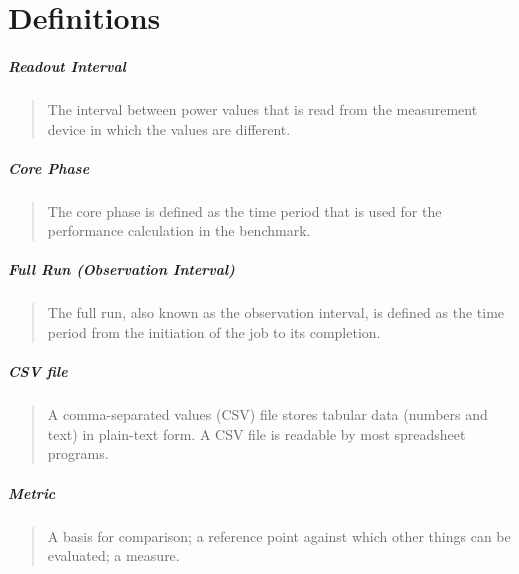 \chapter{Definitions}
\label{sec:definitions}

\setlength{\parskip}{1pt}
\paragraph*{Readout Interval}
\begin{quote}
The interval between power values that is read from the measurement device in which the values are different.
\end{quote}

\setlength{\parskip}{1pt}
\paragraph*{Core Phase}
\begin{quote}
The core phase is defined as the time period that is used for the performance calculation in the benchmark.
\end{quote}

\setlength{\parskip}{1pt}
\paragraph*{Full Run (Observation Interval)}
\begin{quote}
The full run, also known as the observation interval, is defined as the time period from the initiation of the job to its completion.
\end{quote}


\paragraph*{CSV file}
\begin{quote}
A comma-separated values (CSV) file stores tabular data (numbers and text) in plain-text form.
A CSV file is readable by most spreadsheet programs.
\end{quote}

\paragraph*{Metric}
\begin{quote}
A basis for comparison; a reference point against which other things can be evaluated; a measure.
\end{quote}

